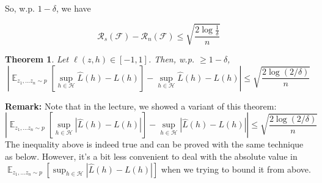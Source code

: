 \documentclass[11pt]{article}
\DeclareMathOperator*{\E}{\mathbb{E}}
\newtheorem{theorem}{Theorem}
\begin{document}
So, w.p. $1-\delta$, we have

\begin{equation} \label{eq:10}
    \mathcal{R}_s(\mathcal{F}) - \mathcal{R}_n(\mathcal{F}) \leq \sqrt{\frac{2\log{\frac{1}{\delta}}}{n}}
\end{equation}

\begin{theorem}
  \label{theorem:concentration}
Let $\ell(z,h) \in [-1,1]$. Then, w.p. $\geq 1 - \delta$,
\begin{equation}
    \left| \E_{z_1,...z_n \sim p} \left[\sup_{h\in\mathcal{H}} \hat{L}(h)-L(h)\right] -
        \sup_{h\in\mathcal{H}} \hat{L}(h)-L(h)
    \right| \le \sqrt{\frac{2\log (2/\delta)}{n}}
\end{equation}
\end{theorem}

{\bf Remark:} Note that in the lecture, we showed a variant of this theorem:
$$
\left| \E_{z_1,...z_n \sim p} \left[\sup_{h\in\mathcal{H}} |\hat{L}(h)-L(h)|\right] -
\sup_{h\in\mathcal{H}} |\hat{L}(h)-L(h)|
\right| \le \sqrt{\frac{2\log (2/\delta)}{n}}
$$
\sloppy The inequality above is indeed true and can be proved with the same technique as below. However, it's a bit less convenient to deal with the absolute value in $ \E_{z_1,...z_n \sim p} \left[\sup_{h\in\mathcal{H}} |\hat{L}(h)-L(h)|\right]
$ when we trying to bound it from above. 
\end{document}
